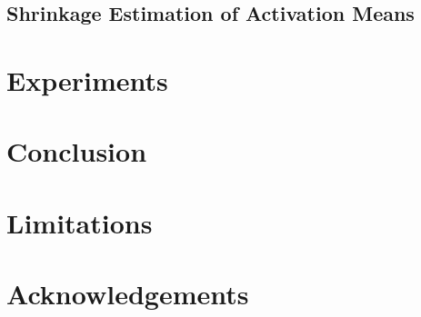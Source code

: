 \documentclass[table, 11pt]{article}
\begin{document}


\subsection{Shrinkage Estimation of Activation Means}



\section{Experiments}



\section{Conclusion}

\section{Limitations}


\section*{Acknowledgements}






\newpage
\appendix
\end{document}
